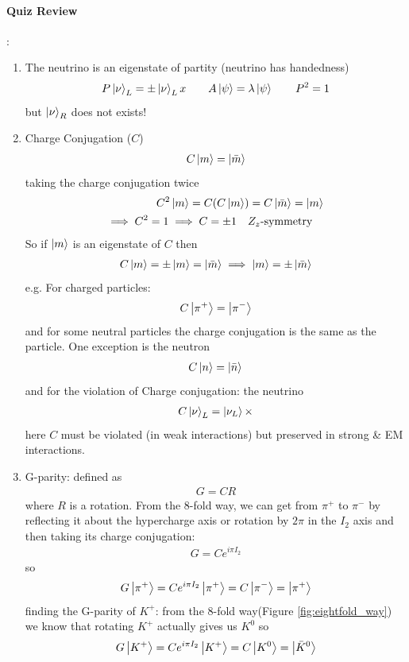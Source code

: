 \documentclass[../main.tex]{subfiles}
\begin{document}
\paragraph*{Quiz Review}:
\begin{enumerate}
    \item The neutrino is an eigenstate of partity (neutrino has handedness)
    \begin{align*}
        P \ket{\nu}_L = \pm \ket{\nu}_L x \qquad A\ket \psi = \lambda \ket \psi
        \qquad P^2 = 1
    \end{align*}
    but $\ket \nu_R$ does not exists!
    \item Charge Conjugation ($C$)
    \begin{align*}
        C \ket m = \ket{\bar m}
    \end{align*}
    taking the charge conjugation twice
    \begin{align*}
        C^2 \ket m = C(C\ket m) = C\ket{\bar m} = \ket m \\
        \implies C^2 = 1 \implies C = \pm 1 \qqtext{$Z_z$-symmetry}
    \end{align*}
    So if $\ket m$ is an eigenstate of $C$ then
    \begin{align*}
        C \ket m = \pm \ket m = \ket{\bar m} \implies \ket m = \pm \ket{\bar m}
    \end{align*}
    e.g. For charged particles:
    \begin{align*}
        C \ket{\pi^+} = \ket{\pi^-}
    \end{align*}
    and for some neutral particles the charge conjugation is the same as the particle.
    One exception is the neutron
    \begin{align*}
        C\ket n = \ket{\bar n}
    \end{align*}
    and for the violation of Charge conjugation: the neutrino
    \begin{align*}
        C \ket \nu_L = \ket{\nu_L} \times
    \end{align*}
    here $C$ must be violated (in weak interactions) but preserved in strong \& EM interactions.
    \item G-parity: defined as
    \begin{align*}
        G = C R
    \end{align*}
    where $R$ is a rotation. From the 8-fold way, we can get from $\pi^+$ to $\pi^-$ by reflecting 
    it about the hypercharge axis or rotation by $2\pi$ in the $I_2$ axis and then taking its 
    charge conjugation:
    \begin{align*}
        G = C e^{i\pi I_2}
    \end{align*}
    so
    \begin{align*}
        G\ket{\pi^+} = C e^{i\pi I_2} \ket{\pi^+} = C \ket{\pi^-} = \ket{\pi^+}
    \end{align*}
    finding the G-parity of $K^+$: from the 8-fold way(Figure \ref{fig:eightfold_way}) we know that
    rotating $K^+$ actually gives us $K^0$ so
    \begin{align*}
        G \ket{K^+} = C e^{i\pi I_2} \ket{K^+} = C \ket{K^0} = \ket{\bar K^0}
    \end{align*}

\end{enumerate}
\end{document}
